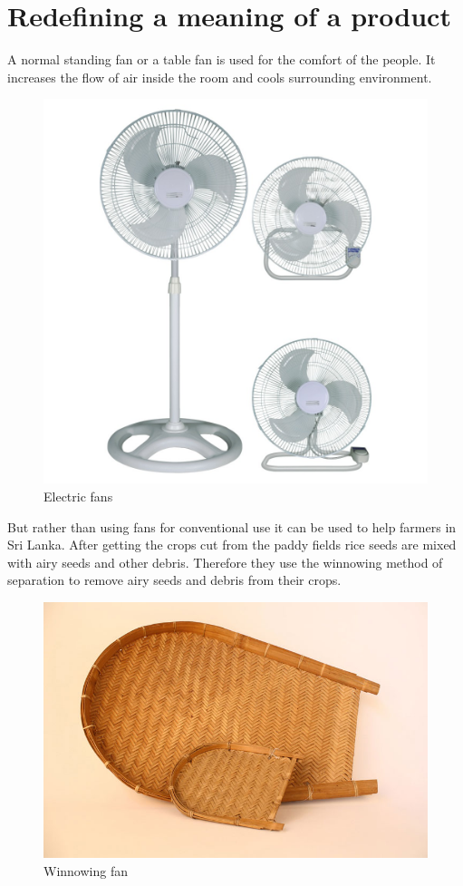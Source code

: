 \documentclass[12pt]{article}
\begin{document}

\tableofcontents
\pagebreak


\section{Redefining a meaning of a product }
A normal standing fan or a table fan is used for the comfort of the people. It increases the flow of air inside the room and cools surrounding environment. 

\begin{figure}[h!]
  \centering
  \includegraphics[width=0.5\linewidth]{fan.jpg}
  \caption{Electric fans}
  \label{fig:Electric fans}
\end{figure}

But rather than using fans for conventional use it can be used to help farmers in Sri Lanka. After getting the crops cut from the paddy fields rice seeds are mixed with airy seeds and other debris. Therefore they use the winnowing method of separation to remove airy seeds and debris from their crops.

\vspace{0.5 cm}

\begin{figure}[h!]
  \centering
  \includegraphics[width=0.5\linewidth]{winnowing fan.jpg}
  \caption{Winnowing fan}
  \label{fig:Winnowing fan}
\end{figure}
\end{document}
